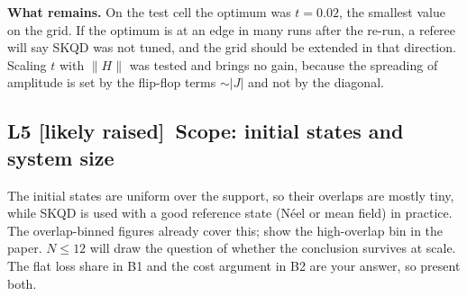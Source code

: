 \documentclass[11pt,a4paper]{article}
\newcommand{\sev}[1]{\textsf{\small[#1]}}
\newcommand{\likely}{\textcolor{likely}{\sev{likely raised}}}
\begin{document}
\textbf{What remains.} On the test cell the optimum was $t=0.02$, the smallest value on
the grid. If the optimum is at an edge in many runs after the re-run, a referee will
say SKQD was not tuned, and the grid should be extended in that direction. Scaling $t$ with
$\|H\|$ was tested and brings no gain, because the spreading of amplitude is set by the
flip-flop terms $\sim|J|$ and not by the diagonal.

\subsection*{L5 \likely\ Scope: initial states and system size}
The initial states are uniform over the support, so their overlaps are mostly tiny, while
SKQD is used with a good reference state (N\'eel or mean field) in practice. The
overlap-binned figures already cover this; show the high-overlap bin in the paper.
$N\le12$ will draw the question of whether the conclusion survives at scale. The flat
loss share in B1 and the cost argument in B2 are your answer, so present both.
\end{document}
